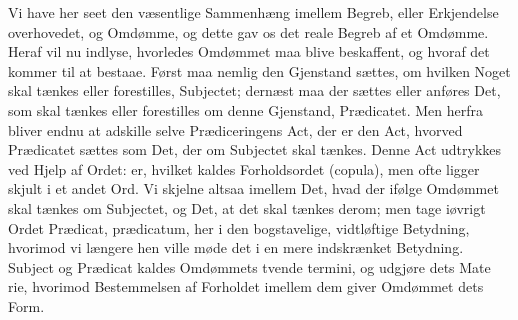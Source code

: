\documentclass[12pt]{book}
\def\sperr#1{#1}%
\def\textit#1{#1}%
\def\emph#1{#1}%
\newcommand{\sperr}[1]{\textls[180]{#1}}
\newcommand{\opage}[1]{\marginnote{\footnotesize\textit{[#1]}}}
\begin{document}
Vi have her seet den væsentlige Sammenhæng imellem Begreb, eller Erkjendelse
overhovedet, og Omdømme, og dette gav os det reale Begreb af et \emph{Omdømme}. Heraf
vil nu indlyse, hvorledes Omdømmet maa blive beskaffent, og hvoraf det kommer til at
bestaae. Først maa nemlig den Gjenstand sættes, om hvilken Noget skal tænkes eller
forestilles, \emph{Subjectet}; dernæst maa der sættes eller anføres Det, som skal
tænkes eller forestilles om denne Gjenstand, \emph{Prædicatet}. Men herfra bliver endnu
at adskille selve \emph{Prædiceringens \sperr{Act}}, der er den \emph{Act}, hvorved
\emph{Prædicatet} sættes som Det, der om \emph{Subjectet} skal tænkes. Denne \emph{Act}
udtrykkes ved Hjelp af Ordet: er, hvilket kaldes \emph{Forholdsordet}
(\textit{copula}), men ofte ligger skjult i et andet Ord. Vi skjelne altsaa imellem
Det, hvad der ifølge Omdømmet skal tænkes om \emph{Subjectet}, og Det, at det skal
tænkes derom; men tage iøvrigt Ordet \emph{Prædicat}, \textit{prædicatum}, her i den
bogstavelige, vidtløftige Betydning, hvorimod vi længere hen ville møde det i en mere
indskrænket Betydning. \emph{Subject} og \emph{Prædicat} kaldes Omdømmets tvende
\textit{termini}, og udgjøre dets \emph{Mate%
\opage{250}rie}, hvorimod Bestemmelsen af Forholdet imellem dem giver Omdømmet dets Form.
\end{document}
